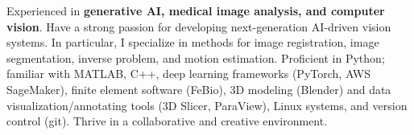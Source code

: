 

\begin{cvparagraph}

Experienced in \textbf{
generative AI, 
medical image analysis, 
and computer vision}. 
Have a strong passion for developing next-generation AI-driven vision systems. 
In particular, I specialize in methods for image registration, image segmentation, inverse problem, and motion estimation. Proficient in Python; familiar with MATLAB, C++, deep learning frameworks (PyTorch, AWS SageMaker), finite element software (FeBio), 3D modeling (Blender) and data visualization/annotating tools (3D Slicer, ParaView), Linux systems, and version control (git). Thrive in a collaborative and creative environment.


\end{cvparagraph}
